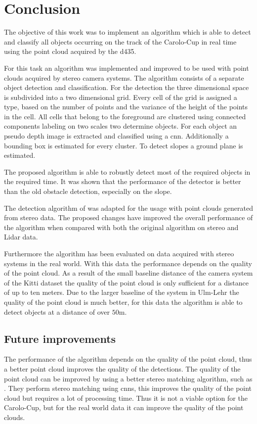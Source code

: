 \chapter{Conclusion} \label{sec:conc}
The objective of this work was to implement an algorithm which is able to detect and classify all objects occurring on the track of the Carolo-Cup in real time using the point cloud acquired by the \ac{d435}.

For this task an algorithm was implemented and improved to be used with point clouds acquired by stereo camera systems. 
The algorithm consists of a separate object detection and classification. 
For the detection the three dimensional space is subdivided into a two dimensional grid. 
Every cell of the grid is assigned a type, based on the number of points and the variance of the height of the points in the cell. 
All cells that belong to the foreground are clustered using connected components labeling on two scales two determine objects.
For each object an pseudo depth image is extracted and classified using a \ac{cnn}. 
Additionally a bounding box is estimated for every cluster.
To detect slopes a ground plane is estimated.

The proposed algorithm is able to robustly detect most of the required objects in the required time.
It was shown that the performance of the detector is better than the old obstacle detection, especially on the slope. 

The detection algorithm of \cite{AttBen17} was adapted for the usage with point clouds generated from stereo data. The proposed changes have improved the overall performance of the algorithm when compared with both the original algorithm on stereo and Lidar data.

Furthermore the algorithm has been evaluated on data acquired with stereo systems in the real world. 
With this data the performance depends on the quality of the point cloud. 
As a result of the small baseline distance of the camera system of the Kitti dataset the quality of the point cloud is only sufficient for a distance of up to ten meters.
Due to the larger baseline of the system in Ulm-Lehr the quality of the point cloud is much better, for this data the algorithm is able to detect objects at a distance of over $50\si{\m}$.

\section{Future improvements}
The performance of the algorithm depends on the quality of the point cloud, thus a better point cloud improves the quality of the detections. 
The quality of the point cloud can be improved by using a better stereo matching algorithm, such as \cite{chang2018pyramid} \cite{luo16} \cite{zbontar16}. 
They perform stereo matching using \ac{cnn}s, this improves the quality of the point cloud but requires a lot of processing time. 
Thus it is not a viable option for the Carolo-Cup, but for the real world data it can improve the quality of the point clouds.

